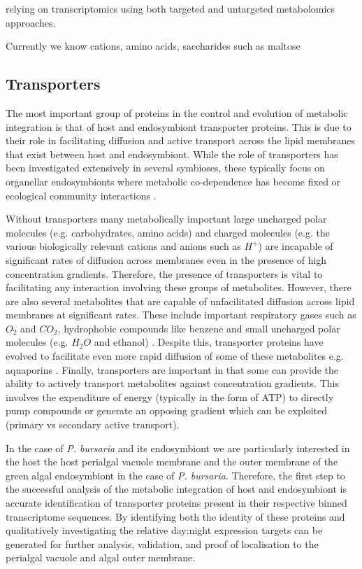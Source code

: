 relying on transcriptomics using both
targeted and untargeted metabolomics approaches. 


Currently we know cations, amino acids, saccharides such as maltose


\subsection{Transporters}
The most important group of proteins in the control and evolution
of metabolic integration is that of host and endosymbiont transporter proteins.
This is due to their role in facilitating diffusion and active transport
across the lipid membranes that exist between host and endosymbiont.
While the role of transporters has been investigated extensively in 
several symbioses, these typically focus on organellar endosymbionts where
metabolic co-dependence has become fixed \citep{Yuan1994,Tyra2007,Huang2007,Li2010a} 
or ecological community interactions 
\citep{Richards2013,Hirner2006,Bachmann2013,Oldroyd2009}.


Without transporters many metabolically important 
large uncharged polar molecules (e.g. carbohydrates, amino acids)
and charged molecules (e.g. the various biologically relevant cations and anions such
as \(H^{+}\)) are incapable of significant rates of diffusion 
across membranes even in the presence of high concentration gradients. 
Therefore, the presence of transporters is vital to facilitating
any interaction involving these groups of metabolites. 
However, there are also several metabolites that are capable 
of unfacilitated diffusion across lipid membranes at significant rates.
These include important respiratory gases such as \(O_{2}\) and \(CO_2\),
hydrophobic compounds like benzene and small uncharged polar molecules
(e.g. \(H_2O\) and ethanol) \citep{cooper2013the,alberts2015molecular}.  
Despite this, transporter proteins have evolved to facilitate
even more rapid diffusion of some of these metabolites e.g. aquaporins
\citep{Agre1993}.  
Finally, transporters are important in that some can provide the ability
to actively transport metabolites against concentration gradients. 
This involves the expenditure of energy (typically in the form of ATP)
to directly pump compounds or generate an opposing gradient which can be
exploited (primary vs secondary active transport).


In the case of \textit{P. bursaria} and its endosymbiont we are
particularly interested in the host 
the host perialgal vacuole membrane and the outer membrane of the green
algal endosymbiont in the case of \textit{P. bursaria}.  
Therefore, the first step to the successful analysis of the metabolic
integration of host and endosymbiont is accurate identification of
transporter proteins present in their respective binned transcriptome
sequences.   By identifying both the identity of these proteins 
and qualitatively investigating the relative day:night expression
targets can be generated for further analysis, validation, and 
proof of localisation to the perialgal vacuole and algal outer
membrane.


